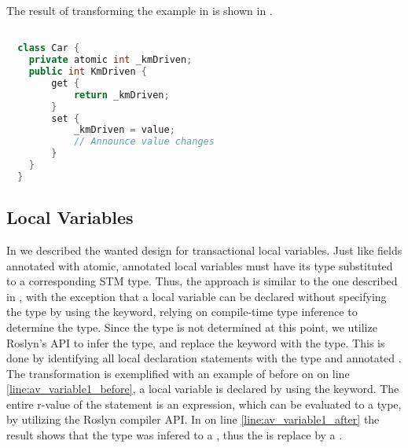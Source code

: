 The result of transforming the example in  is shown in .
\begin{lstlisting}[label=lst:after_atomic_property,
  caption={After Transformation},
  language=Java,  
  showspaces=false,
  showtabs=false,
  breaklines=true,
  showstringspaces=false,
  breakatwhitespace=true,
  commentstyle=\color{greencomments},
  keywordstyle=\color{bluekeywords},
  stringstyle=\color{redstrings},
  morekeywords={atomic, retry, orElse, var, get, set}]  % Start your code-block

  class Car {
    private atomic int _kmDriven;
    public int KmDriven {
        get {
            return _kmDriven;
        }
        set {
            _kmDriven = value;
            // Announce value changes
        }
    }
  }
\end{lstlisting}


\subsection{Local Variables}
In  we described the wanted design for transactional local variables. 
Just like fields annotated with atomic, annotated local variables must have its type substituted to a corresponding \ac{STM} type. Thus, the approach is similar to the one described in , with the exception that a local variable can be declared without specifying the type by using the  keyword, relying on compile-time type inference to determine the type. Since the type is not determined at this point, we utilize Roslyn's \ac{API} to infer the type, and replace the  keyword with the type. This is done by identifying all local declaration statements with the type  and annotated . The transformation is exemplified with an example of before on  on line \ref{line:av_variable1_before}, a local variable is declared by using the  keyword. The entire r-value of the statement is an expression, which can be evaluated to a type, by utilizing the Roslyn compiler \ac{API}. In  on line  \ref{line:av_variable1_after} the result shows that the type was infered to a , thus the  is replace by a .

